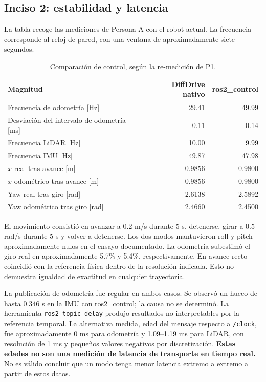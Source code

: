 \documentclass[11pt,a4paper]{article}
\newcommand{\archivo}[1]{\nolinkurl{#1}}
\begin{document}
\subsection{Inciso 2: estabilidad y latencia}
La tabla recoge las mediciones de Persona A con el robot actual. La frecuencia corresponde al reloj de pared, con una ventana de aproximadamente siete segundos.
\begin{table}[H]\centering\caption{Comparación de control, según la re-medición de P1.}
\begin{tabular}{lrr}\toprule
Magnitud & DiffDrive nativo & ros2\_control\\\midrule
Frecuencia de odometría [Hz] & 29.41 & 49.99\\
Desviación del intervalo de odometría [ms] & 0.11 & 0.14\\
Frecuencia LiDAR [Hz] & 10.00 & 9.99\\
Frecuencia IMU [Hz] & 49.87 & 47.98\\
$x$ real tras avance [m] & 0.9856 & 0.9800\\
$x$ odométrico tras avance [m] & 0.9856 & 0.9800\\
Yaw real tras giro [rad] & 2.6138 & 2.5892\\
Yaw odométrico tras giro [rad] & 2.4660 & 2.4500\\\bottomrule
\end{tabular}\end{table}
El movimiento consistió en avanzar a $0.2$ m/s durante 5 s, detenerse, girar a $0.5$ rad/s durante 5 s y volver a detenerse. Los dos modos mantuvieron roll y pitch aproximadamente nulos en el ensayo documentado. La odometría subestimó el giro real en aproximadamente 5.7\% y 5.4\%, respectivamente. En avance recto coincidió con la referencia física dentro de la resolución indicada. Esto no demuestra igualdad de exactitud en cualquier trayectoria.

La publicación de odometría fue regular en ambos casos. Se observó un hueco de hasta $0.346$ s en la IMU con ros2\_control; la causa no se determinó. La herramienta \archivo{ros2 topic delay} produjo resultados no interpretables por la referencia temporal. La alternativa medida, edad del mensaje respecto a \archivo{/clock}, fue aproximadamente 0 ms para odometría y 1.09--1.19 ms para LiDAR, con resolución de 1 ms y pequeños valores negativos por discretización. \textbf{Estas edades no son una medición de latencia de transporte en tiempo real.} No es válido concluir que un modo tenga menor latencia extremo a extremo a partir de estos datos.
\end{document}

